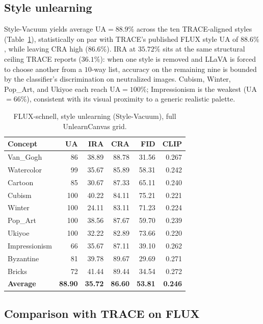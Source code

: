 \documentclass{article}
\begin{document}
\subsection{Style unlearning}
\label{sec:exp_style}

Style-Vacuum yields average UA${=}\mathbf{88.9\%}$ across the ten
TRACE-aligned styles (Table~\ref{tab:style}), statistically on par
with TRACE's published FLUX style UA of $88.6\%$, while leaving CRA
high ($86.6\%$). IRA at $35.72\%$ sits at the same structural ceiling
TRACE reports ($36.1\%$): when one style is removed and LLaVA is
forced to choose another from a $10$-way list, accuracy on the
remaining nine is bounded by the classifier's discrimination on
neutralized images. Cubism, Winter, Pop\_Art, and Ukiyoe each reach
UA${=}100\%$; Impressionism is the weakest (UA${=}66\%$), consistent
with its visual proximity to a generic realistic palette.

\begin{table}[t]
\caption{FLUX-schnell, style unlearning (Style-Vacuum), full
UnlearnCanvas grid.}
\label{tab:style}
\centering
\small
\begin{tabular}{lrrrrr}
\toprule
Concept & UA & IRA & CRA & FID & CLIP \\
\midrule
Van\_Gogh       & 86  & 38.89 & 88.78 & 31.56 & 0.267 \\
Watercolor      & 99  & 35.67 & 85.89 & 58.31 & 0.242 \\
Cartoon         & 85  & 30.67 & 87.33 & 65.11 & 0.240 \\
Cubism          & 100 & 40.22 & 84.11 & 75.21 & 0.221 \\
Winter          & 100 & 24.11 & 83.11 & 71.23 & 0.224 \\
Pop\_Art        & 100 & 38.56 & 87.67 & 59.70 & 0.239 \\
Ukiyoe          & 100 & 32.22 & 82.89 & 73.66 & 0.220 \\
Impressionism   & 66  & 35.67 & 87.11 & 39.10 & 0.262 \\
Byzantine       & 81  & 39.78 & 89.67 & 29.69 & 0.271 \\
Bricks          & 72  & 41.44 & 89.44 & 34.54 & 0.272 \\
\midrule
\textbf{Average} & \textbf{88.90} & \textbf{35.72} & \textbf{86.60} & \textbf{53.81} & \textbf{0.246} \\
\bottomrule
\end{tabular}
\end{table}

\subsection{Comparison with TRACE on FLUX}
\label{sec:exp_compare}
\end{document}
